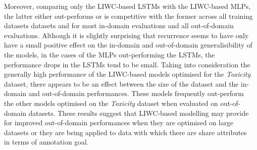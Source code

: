 Moreover, comparing only the LIWC-based LSTMs with the LIWC-based MLPs, the latter either out-performs or is competitive with the former across all training datasets datasets and for most in-domain evaluations and all out-of-domain evaluations.
Although it is slightly surprising that recurrence seems to have only have a small positive effect on the in-domain and out-of-domain generalisibility of the models, in the cases of the MLPs out-performing the LSTMs, the performance drops in the LSTMs tend to be small.
Taking into consideration the generally high performance of the LIWC-based models optimised for the \textit{Toxicity} dataset, there appears to be an effect between the size of the dataset and the in-domain and out-of-domain performances.
These models frequently out-perform the other models optimised on the \textit{Toxicity} dataset when evaluated on out-of-domain datasets.
These results suggest that LIWC-based modelling may provide for improved out-of-domain performances when they are optimised on large datasets or they are being applied to data with which there are share attributes in terms of annotation goal.

